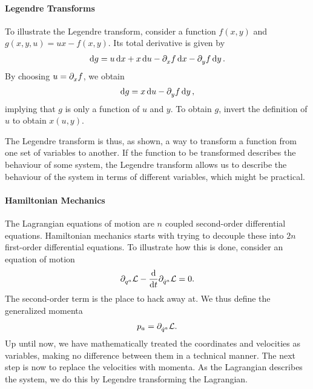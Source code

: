 \paragraph{Legendre Transforms}
To illustrate the Legendre transform, consider a function $f(x, y)$ and $g(x, y, u) = ux - f(x, y)$. Its total derivative is given by
\begin{align*}
	\dd{g} = u\dd{x} + x\dd{u} - \partial^{}_{x}f\dd{x} - \partial^{}_{y}f\dd{y}.
\end{align*}
By choosing $u = \partial^{}_{x}f$, we obtain
\begin{align*}
	\dd{g} = x\dd{u} - \partial^{}_{y}f\dd{y},
\end{align*}
implying that $g$ is only a function of $u$ and $y$. To obtain $g$, invert the definition of $u$ to obtain $x(u, y)$.

The Legendre transform is thus, as shown, a way to transform a function from one set of variables to another. If the function to be transformed describes the behaviour of some system, the Legendre transform allows us to describe the behaviour of the system in terms of different variables, which might be practical.

\paragraph{Hamiltonian Mechanics}
The Lagrangian equations of motion are $n$ coupled second-order differential equations. Hamiltonian mechanics starts with trying to decouple these into $2n$ first-order differential equations. To illustrate how this is done, consider an equation of motion
\begin{align*}
	\partial^{}_{q^{a}}\mathcal{L} - \dv{t}\partial^{}_{\dot{q}^{a}}\mathcal{L} = 0.
\end{align*}
The second-order term is the place to hack away at. We thus define the generalized momenta
\begin{align*}
	p_{a} = \partial^{}_{\dot{q}^{a}}\mathcal{L}.
\end{align*}
Up until now, we have mathematically treated the coordinates and velocities as variables, making no difference between them in a technical manner. The next step is now to replace the velocities with momenta. As the Lagrangian describes the system, we do this by Legendre transforming the Lagrangian.

